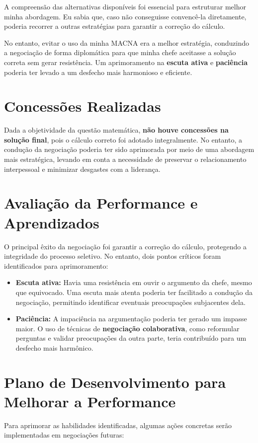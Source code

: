 \documentclass[11pt]{article}
\begin{document}
A compreensão das alternativas disponíveis foi essencial para estruturar melhor minha abordagem. Eu sabia que, caso não conseguisse convencê-la diretamente, poderia recorrer a outras estratégias para garantir a correção do cálculo.

No entanto, evitar o uso da minha MACNA era a melhor estratégia, conduzindo a negociação de forma diplomática para que minha chefe aceitasse a solução correta sem gerar resistência. Um aprimoramento na \textbf{escuta ativa} e \textbf{paciência} poderia ter levado a um desfecho mais harmonioso e eficiente.
\section*{Concessões Realizadas}
\label{sec:org218593e}
Dada a objetividade da questão matemática, \textbf{não houve concessões na solução final}, pois o cálculo correto foi adotado integralmente. No entanto, a condução da negociação poderia ter sido aprimorada por meio de uma abordagem mais estratégica, levando em conta a necessidade de preservar o relacionamento interpessoal e minimizar desgastes com a liderança.
\section*{Avaliação da Performance e Aprendizados}
\label{sec:org418d575}
O principal êxito da negociação foi garantir a correção do cálculo, protegendo a integridade do processo seletivo. No entanto, dois pontos críticos foram identificados para aprimoramento:

\begin{itemize}
\item \textbf{Escuta ativa:} Havia uma resistência em ouvir o argumento da chefe, mesmo que equivocado. Uma escuta mais atenta poderia ter facilitado a condução da negociação, permitindo identificar eventuais preocupações subjacentes dela.
\item \textbf{Paciência:} A impaciência na argumentação poderia ter gerado um impasse maior. O uso de técnicas de \textbf{negociação colaborativa}, como reformular perguntas e validar preocupações da outra parte, teria contribuído para um desfecho mais harmônico.
\end{itemize}
\section*{Plano de Desenvolvimento para Melhorar a Performance}
\label{sec:org9325c5f}
Para aprimorar as habilidades identificadas, algumas ações concretas serão implementadas em negociações futuras:
\end{document}
